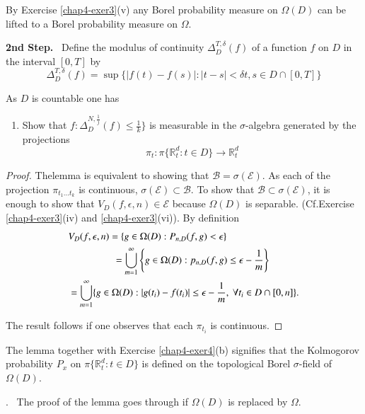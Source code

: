 \begin{remark*}
By Exercise \ref{chap4-exer3}(v) any Borel probability measure on
$\Omega(D)$ can be lifted to a Borel probability measure on $\Omega$.
\end{remark*}

\noindent
{\bf 2nd Step.}~ Define the modulus of continuity
$\Delta^{T,\delta}_{D}(f)$ of a function $f$ on $D$ in the interval
$[0,T]$ by
$$
\Delta^{T,\delta}_{D}(f)=\sup \{|f(t)-f(s)|:|t-s|<\delta t,s\in D\cap
      [0,T]\}
$$

As $D$ is countable one has

\begin{exercise}\label{chap4-exer4}
\begin{enumerate}
\renewcommand{\theenumi}{\alph{enumi}}
\renewcommand{\labelenumi}{(\theenumi)}
\item Show that $f:\Delta^{N,\frac{1}{j}}_{D}(f)\leq \frac{1}{k}\}$ is
  measurable in the $\sigma$-algebra generated by the projections
$$
\pi_{t}:\pi\{\mathbb{R}^{d}_{t}:t\in D\}\to \mathbb{R}^{d}_{t}
$$
\end{enumerate}
\end{exercise}

\begin{proof}
The\pageoriginale lemma is equivalent to showing that
$\mathscr{B}=\sigma(\mathscr{E})$. As each of the projection
$\pi_{t_{1}\ldots t_{k}}$ is continuous, $\sigma(\mathscr{E})\subset
\mathscr{B}$. To show that $\mathscr{B}\subset \sigma(\mathscr{E})$,
it is enough to show that $V_{D}(f,\epsilon,n)\in\mathscr{E}$ because
$\Omega(D)$ is separable. (Cf.\@ Exercise \ref{chap4-exer3}(iv) and
\ref{chap4-exer3}(vi)). By definition
\begin{align*}
& V_{D}(f,\epsilon,n)=\{g\in \Omega(D):P_{n,D}(f,g)<\epsilon\}\\
&\hspace{1.6cm} = \bigcup^{\infty}_{m=1}\left\{g\in
  \Omega(D):p_{n,D}(f,g)\leq \epsilon-\frac{1}{m}\right\}\\
&=\bigcup^{\infty}_{m=1}\{g\in\Omega(D):|g(t_{i})-f(t_{i})|\leq
  \epsilon -\frac{1}{m},\ \forall t_{i}\in D\cap [0,n]\}.
\end{align*}

The result follows if one observes that each $\pi_{t_{i}}$ is continuous.
\end{proof}

\setcounter{remark}{0}
\begin{remark}\label{chap4-rem1}
The lemma together with Exercise \ref{chap4-exer4}(b) signifies that
the Kolmogorov probability $P_{x}$ on $\pi\{\mathbb{R}^{d}_{t}:t\in
D\}$ is defined on the topological Borel $\sigma$-field of
$\Omega(D)$.

.~ The proof of the lemma goes through if $\Omega(D)$ is replaced by
$\Omega$. 
\end{remark}


